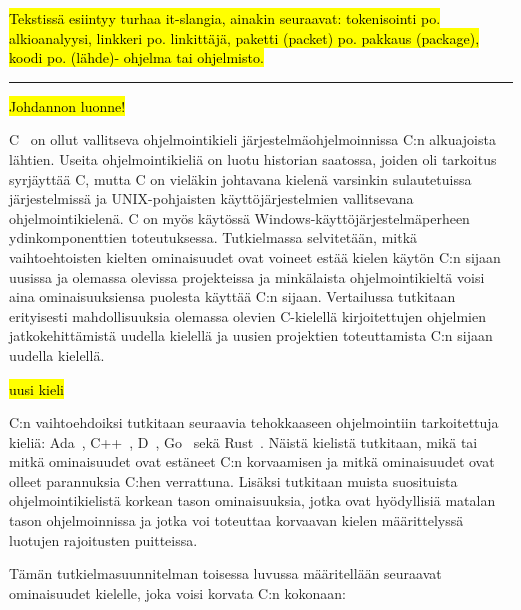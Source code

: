 \hl{Tekstissä esiintyy turhaa it-slangia, ainakin seuraavat:  tokenisointi  po.
alkioanalyysi, linkkeri  po. linkittäjä,   paketti (packet) po. pakkaus
(package), koodi po. (lähde)- ohjelma tai ohjelmisto.}

\hrule

\hl{Johdannon luonne!}

C~\citep{C18} on ollut vallitseva ohjelmointikieli järjestelmäohjelmoinnissa
C:n alkuajoista lähtien. Useita ohjelmointikieliä on luotu historian saatossa,
joiden oli tarkoitus syrjäyttää C, mutta C on vieläkin johtavana kielenä
varsinkin sulautetuissa järjestelmissä ja UNIX-pohjaisten käyttöjärjestelmien
vallitsevana ohjelmointikielenä. C on myös käytössä
Windows-käyttöjärjestelmäperheen ydinkomponenttien toteutuksessa.
Tutkielmassa selvitetään, mitkä vaihtoehtoisten kielten ominaisuudet ovat
voineet estää kielen käytön C:n sijaan uusissa ja olemassa olevissa projekteissa
ja minkälaista ohjelmointikieltä voisi aina ominaisuuksiensa puolesta käyttää
C:n sijaan. Vertailussa tutkitaan erityisesti mahdollisuuksia olemassa olevien
C-kielellä kirjoitettujen ohjelmien jatkokehittämistä uudella kielellä ja
uusien projektien toteuttamista C:n sijaan uudella kielellä.

\hl{uusi kieli}

C:n vaihtoehdoiksi tutkitaan seuraavia tehokkaaseen ohjelmointiin tarkoitettuja
kieliä: Ada~\citep{ADA12}, C++~\citep{CPP17}, D~\citep{D}, Go~\citep{golang}
sekä Rust~\citep{rust}. Näistä kielistä tutkitaan, mikä tai mitkä ominaisuudet
ovat estäneet C:n korvaamisen ja mitkä ominaisuudet ovat olleet parannuksia
C:hen verrattuna. Lisäksi tutkitaan muista suosituista ohjelmointikielistä
korkean tason ominaisuuksia, jotka ovat hyödyllisiä matalan tason
ohjelmoinnissa ja jotka voi toteuttaa korvaavan kielen määrittelyssä luotujen
rajoitusten puitteissa.


Tämän tutkielmasuunnitelman toisessa luvussa määritellään seuraavat
ominaisuudet kielelle, joka voisi korvata C:n kokonaan:


